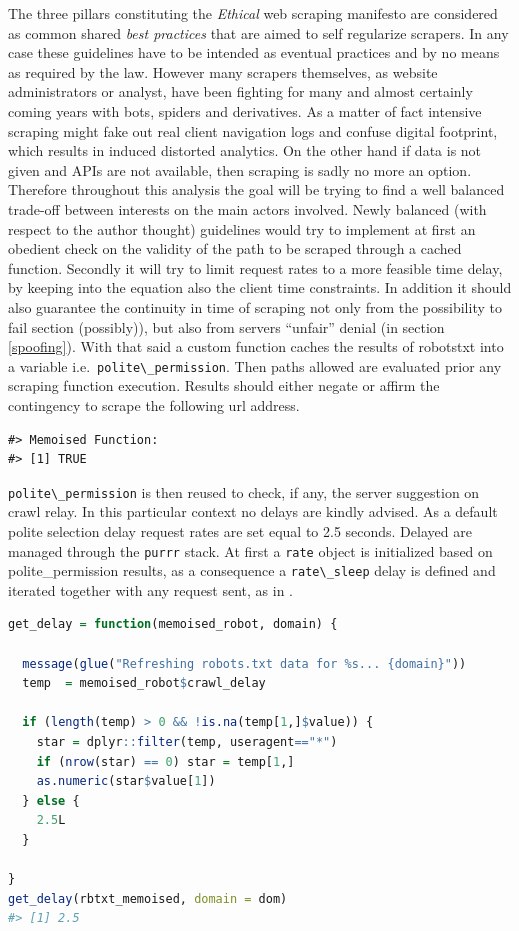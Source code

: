 \documentclass[
  12pt,
  a4paper,
  oneside]{book}
\newcommand{\passthrough}[1]{#1}
\theoremstyle{definition}
\theoremstyle{definition}
\theoremstyle{definition}
\theoremstyle{remark}
\begin{document}
The three pillars constituting the \emph{Ethical} web scraping manifesto \citep{densmore_2019} are considered as common shared \emph{best practices} that are aimed to self regularize scrapers. In any case these guidelines have to be intended as eventual practices and by no means as required by the law. However many scrapers themselves, as website administrators or analyst, have been fighting for many and almost certainly coming years with bots, spiders and derivatives. As a matter of fact intensive scraping might fake out real client navigation logs and confuse digital footprint, which results in induced distorted analytics. On the other hand if data is not given and APIs are not available, then scraping is sadly no more an option.
Therefore throughout this analysis the goal will be trying to find a well balanced trade-off between interests on the main actors involved.
Newly balanced (with respect to the author thought) guidelines would try to implement at first an obedient check on the validity of the path to be scraped through a cached function. Secondly it will try to limit request rates to a more feasible time delay, by keeping into the equation also the client time constraints. In addition it should also guarantee the continuity in time of scraping not only from the possibility to fail section (possibly)), but also from servers ``unfair'' denial (in section \ref{spoofing}).
With that said a custom function caches the results of robotstxt into a variable i.e.~\passthrough{\lstinline!polite\_permission!}. Then paths allowed are evaluated prior any scraping function execution. Results should either negate or affirm the contingency to scrape the following url address.

\begin{lstlisting}
#> Memoised Function:
#> [1] TRUE
\end{lstlisting}

\passthrough{\lstinline!polite\_permission!} is then reused to check, if any, the server suggestion on crawl relay. In this particular context no delays are kindly advised. As a default polite selection delay request rates are set equal to 2.5 seconds. Delayed are managed through the \passthrough{\lstinline!purrr!} stack. At first a \passthrough{\lstinline!rate!} object is initialized based on polite\_permission results, as a consequence a \passthrough{\lstinline!rate\_sleep!} delay is defined and iterated together with any request sent, as in \citet{rate_delay}.

\begin{lstlisting}[language=R]
get_delay = function(memoised_robot, domain) {
  
  message(glue("Refreshing robots.txt data for %s... {domain}"))
  temp  = memoised_robot$crawl_delay
  
  if (length(temp) > 0 && !is.na(temp[1,]$value)) {
    star = dplyr::filter(temp, useragent=="*")
    if (nrow(star) == 0) star = temp[1,]
    as.numeric(star$value[1])
  } else {
    2.5L
  }
  
}
get_delay(rbtxt_memoised, domain = dom)
#> [1] 2.5
\end{lstlisting}
\end{document}
